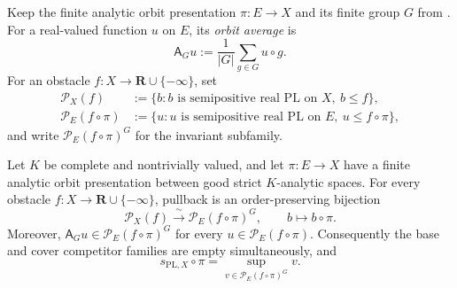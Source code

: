 
\begin{definition}
\label{def:p031-orbit-average-competitors}
Keep the finite analytic orbit presentation $\pi:E\to X$ and its finite
group $G$ from .  For a
real-valued function $u$ on $E$, its \emph{orbit average} is
\begin{equation}
\label{eq:p031-orbit-average}
                 \mathsf A_Gu
                    :=\frac{1}{|G|}\sum_{g\in G}u\circ g.
\end{equation}
For an obstacle $f:X\to\mathbf R\cup\{-\infty\}$, set
\begin{align*}
 \mathcal P_X(f)
  &:=\{b:b\text{ is semipositive real PL on }X,\ b\leq f\},\\
 \mathcal P_E(f\circ\pi)
  &:=\{u:u\text{ is semipositive real PL on }E,\ u\leq f\circ\pi\},
\end{align*}
and write $\mathcal P_E(f\circ\pi)^G$ for the invariant subfamily.
\end{definition}

\begin{theorem}
\label{thm:p031-invariant-real-pl-descent}
Let $K$ be complete and nontrivially valued, and let $\pi:E\to X$ have a
finite analytic orbit presentation between good strict $K$-analytic spaces.
For every obstacle $f:X\to\mathbf R\cup\{-\infty\}$, pullback is an
order-preserving bijection
\begin{equation}
\label{eq:p031-invariant-real-pl-bijection}
 \mathcal P_X(f)
   \xrightarrow{\ \sim\ }
 \mathcal P_E(f\circ\pi)^G,
 \qquad b\longmapsto b\circ\pi.
\end{equation}
Moreover, $\mathsf A_Gu\in\mathcal P_E(f\circ\pi)^G$ for every
$u\in\mathcal P_E(f\circ\pi)$.  Consequently the base and cover competitor
families are empty simultaneously, and
\begin{equation}
\label{eq:p031-invariant-real-pl-subenvelope}
 s_{\mathrm{PL},X}\circ\pi
   =\sup_{v\in\mathcal P_E(f\circ\pi)^G}v.
\end{equation}
\end{theorem}

